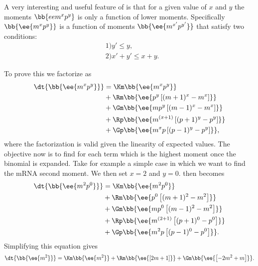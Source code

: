 A very interesting and useful feature of  is that for a given
value of $x$ and $y$ the moments $\bb{ee{m^x p^y}}$ is only a function of lower
moments. Specifically $\bb{\ee{m^x p^y}}$ is a function of moments
$\bb{\ee{m^{x'} p^{y'}}}$ that satisfy two conditions:
\begin{equation}
  \begin{aligned}
    &1) y' \leq y,\\
  &2) x' + y' \leq x + y.
  \end{aligned}
  \label{eq_mom_conditions}
\end{equation}

To prove this we factorize  as
\begin{equation}
  \begin{aligned}
    \dt{\bb{\ee{m^x p^y}}} &=
    \Km \bb{\ee{m^x p^y}}\\
    &+ \Rm \bb{\ee{p^y \left[ (m + 1)^x -m^x \right]}}\\
    &+ \Gm \bb{\ee{m p^y \left[ (m - 1)^x - m^x \right]}}\\
    &+ \Rp \bb{\ee{m^{(x + 1)} \left[ (p + 1)^y - p^y \right]}}\\
    &+ \Gp \bb{\ee{m^x p \left[ (p - 1)^y - p^y \right]}},
    \label{eq_mom_pde_factorized}
  \end{aligned}
\end{equation}
where the factorization is valid given the linearity of expected values. The
objective now is to find for each term which is the highest moment once the
binomial is expanded. Take for example a simple case in which we want to find
the mRNA second moment. We then set $x = 2$ and $y = 0$.
 then becomes
\begin{equation}
  \begin{aligned}
    \dt{\bb{\ee{m^2 p^0}}} &=
    \Km \bb{\ee{m^2 p^0}}\\
    &+ \Rm \bb{\ee{p^0 \left[ (m + 1)^2 - m^2 \right]}}\\
    &+ \Gm \bb{\ee{m p^0 \left[ (m - 1)^2 - m^2 \right]}}\\
    &+ \Rp \bb{\ee{m^{(2 + 1)} \left[ (p + 1)^0 - p^0 \right]}}\\
    &+ \Gp \bb{\ee{m^2 p \left[ (p - 1)^0 - p^0 \right]}}.
  \end{aligned}
\end{equation}
Simplifying this equation gives
\begin{equation}
    \dt{\bb{\ee{m^2}}} =
    \Km \bb{\ee{m^2}}
    + \Rm \bb{\ee{\left[ 2m + 1 \right]}}
    + \Gm \bb{\ee{\left[- 2m^2 + m \right]}}.
    \label{eq_second_mom_mRNA}
\end{equation}

